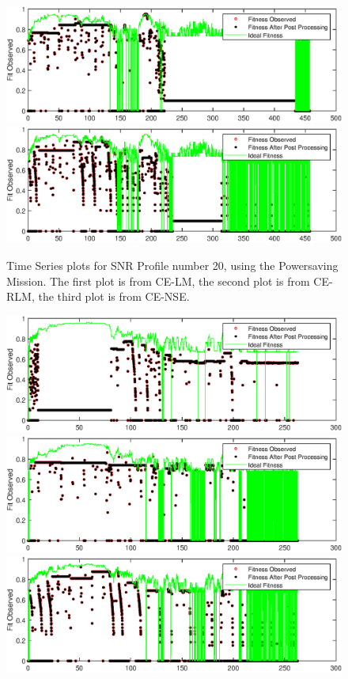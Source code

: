 \begin{appendices}
\begin{figure}[ht!]
\includegraphics{figures/c_sim_timeSeries/Fitness_timeSeries_RLM_20.eps}
\includegraphics{figures/c_sim_timeSeries/Fitness_timeSeries_NSE_20.eps}
\caption{Time Series plots for SNR Profile number 20, using the Powersaving Mission. The first plot is from CE-LM, the second plot is from CE-RLM, the third plot is from CE-NSE.}
\end{figure}
\begin{figure}[ht!]
\includegraphics{figures/c_sim_timeSeries/Fitness_timeSeries_LM_21.eps}
\includegraphics{figures/c_sim_timeSeries/Fitness_timeSeries_RLM_21.eps}
\includegraphics{figures/c_sim_timeSeries/Fitness_timeSeries_NSE_21.eps}

\end{figure}
\end{appendices}

